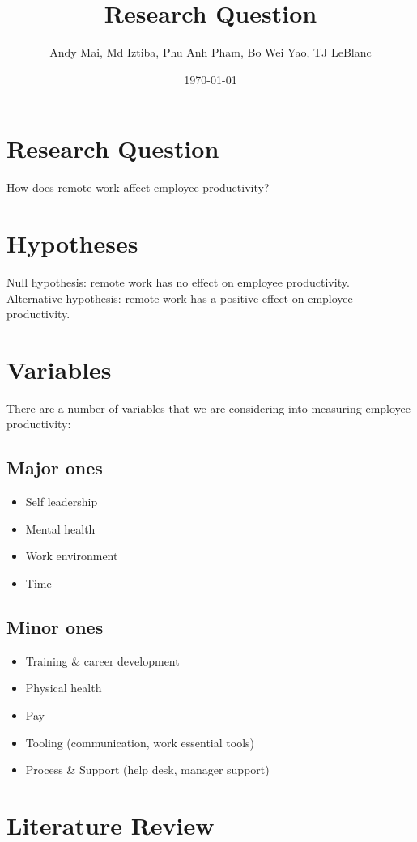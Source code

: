 \documentclass[12pt]{article}
\title{Research Question}
\author{Andy Mai, Md Iztiba, Phu Anh Pham, Bo Wei Yao, TJ LeBlanc}
\date{\today}
\begin{document}
\maketitle
\section*{Research Question}

How does remote work affect employee productivity?

\section*{Hypotheses}
Null hypothesis: remote work has no effect on employee productivity. \\
Alternative hypothesis: remote work has a positive effect on employee productivity. 

\section*{Variables}
There are a number of variables that we are considering into measuring employee productivity: 

\subsection*{Major ones}
\begin{itemize}
  \item Self leadership 
  \item Mental health 
  \item Work environment 
  \item Time
\end{itemize}

\subsection*{Minor ones}
\begin{itemize}
  \item Training & career development 
  \item Physical health 
  \item Pay
  \item Tooling (communication, work essential tools)
  \item Process & Support (help desk, manager support)
\end{itemize}


\section*{Literature Review}
\end{document}
